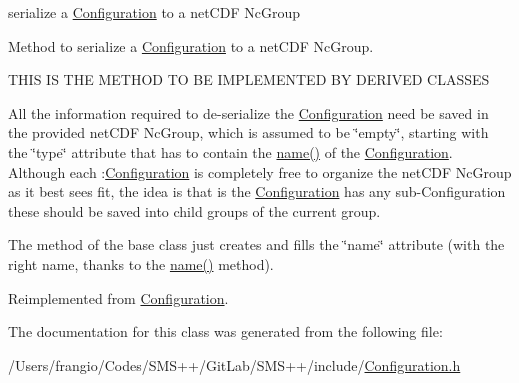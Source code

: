 serialize a \mbox{\hyperlink{class_s_m_spp__di__unipi__it_1_1_configuration}{Configuration}} to a net\+C\+DF Nc\+Group 

Method to serialize a \mbox{\hyperlink{class_s_m_spp__di__unipi__it_1_1_configuration}{Configuration}} to a net\+C\+DF Nc\+Group. \begin{DoxyVerb}THIS IS THE METHOD TO BE IMPLEMENTED BY DERIVED CLASSES
\end{DoxyVerb}


All the information required to de-\/serialize the \mbox{\hyperlink{class_s_m_spp__di__unipi__it_1_1_configuration}{Configuration}} need be saved in the provided net\+C\+DF Nc\+Group, which is assumed to be \char`\"{}empty\char`\"{}, starting with the \char`\"{}type\char`\"{} attribute that has to contain the \mbox{\hyperlink{class_s_m_spp__di__unipi__it_1_1_configuration_a738e9dfd6e00507da219e4bd5a3f6be9}{name()}} of the \mbox{\hyperlink{class_s_m_spp__di__unipi__it_1_1_configuration}{Configuration}}. Although each \+:\mbox{\hyperlink{class_s_m_spp__di__unipi__it_1_1_configuration}{Configuration}} is completely free to organize the net\+C\+DF Nc\+Group as it best sees fit, the idea is that is the \mbox{\hyperlink{class_s_m_spp__di__unipi__it_1_1_configuration}{Configuration}} has any sub-\/\+Configuration these should be saved into child groups of the current group.

The method of the base class just creates and fills the \char`\"{}name\char`\"{} attribute (with the right name, thanks to the \mbox{\hyperlink{class_s_m_spp__di__unipi__it_1_1_configuration_a738e9dfd6e00507da219e4bd5a3f6be9}{name()}} method). 

Reimplemented from \mbox{\hyperlink{class_s_m_spp__di__unipi__it_1_1_configuration_a59f3f59d72c56028f06c555bdcd36caf}{Configuration}}.



The documentation for this class was generated from the following file\+:\begin{DoxyCompactItemize}
\item 
/\+Users/frangio/\+Codes/\+S\+M\+S++/\+Git\+Lab/\+S\+M\+S++/include/\mbox{\hyperlink{_configuration_8h}{Configuration.\+h}}\end{DoxyCompactItemize}

